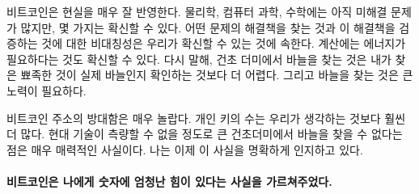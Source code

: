 	\begin{comment}
		Bitcoin is built upon our best understanding of reality. While there are
		still many open problems in physics, computer science, and mathematics,
		we are pretty sure about some things. That there is an asymmetry between
		finding solutions and validating the correctness of these solutions is
		one such thing. That computation needs energy is another one. In other
		words: finding a needle in a haystack is harder than checking if the
		pointy thing in your hand is indeed a needle or not. And finding the
		needle takes work.
	\end{comment}
	비트코인은 현실을 매우 잘 반영한다.
	물리학, 컴퓨터 과학, 수학에는 아직 미해결 문제가 많지만, 몇 가지는 확신할 수 있다.
	어떤 문제의 해결책을 찾는 것과 이 해결책을 검증하는 것에 대한 비대칭성은 우리가 확신할 수 있는 것에 속한다.
	계산에는 에너지가 필요하다는 것도 확신할 수 있다. 
	다시 말해, 건초 더미에서 바늘을 찾는 것은 내가 찾은 뾰족한 것이 실제 바늘인지 확인하는 것보다 더 어렵다. 
	그리고 바늘을 찾는 것은 큰 노력이 필요하다.
	
	\begin{comment}
		The vastness of Bitcoin's address space is truly mind-boggling. The
		number of private keys even more so. It is fascinating how much of our
		modern world boils down to the improbability of finding a needle in an
		unfathomably large haystack. I am now more aware of this fact than ever.
	\end{comment}
	비트코인 주소의 방대함은 매우 놀랍다. 개인 키의 수는 우리가 생각하는 것보다 훨씬 더 많다.
	현대 기술이 측량할 수 없을 정도로 큰 건초더미에서 바늘을 찾을 수 없다는 점은 매우 매력적인 사실이다.
	나는 이제 이 사실을 명확하게 인지하고 있다.
	
	\paragraph{비트코인은 나에게 숫자에 엄청난 힘이 있다는 사실을 가르쳐주었다.}
	

